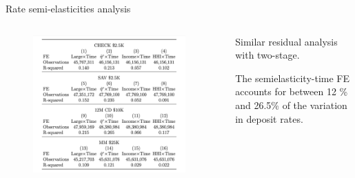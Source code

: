 \documentclass[notes,10pt, aspectratio=169]{beamer}
\newenvironment{wideitemize}{\itemize\addtolength{\itemsep}{10pt}}{\enditemize}
\begin{document}
\begin{frame}{Rate semi-elasticities analysis}

    \begin{columns}[T]
        
        \begin{column}{0.5\textwidth}
        
            \begin{figure}
                \centering
                \includegraphics[width=0.95\textwidth]{imgs/tab7.png}
            \end{figure}

        \end{column}
        \begin{column}{0.5\textwidth}
        

            \begin{wideitemize}
                \item  Similar residual analysis with two-stage.
                \item The semielasticity-time FE accounts for between 12 \% and 26.5\% of the variation in deposit rates.
            \end{wideitemize}
        \end{column}
    \end{columns}
            
\end{frame}
        
\end{document}
